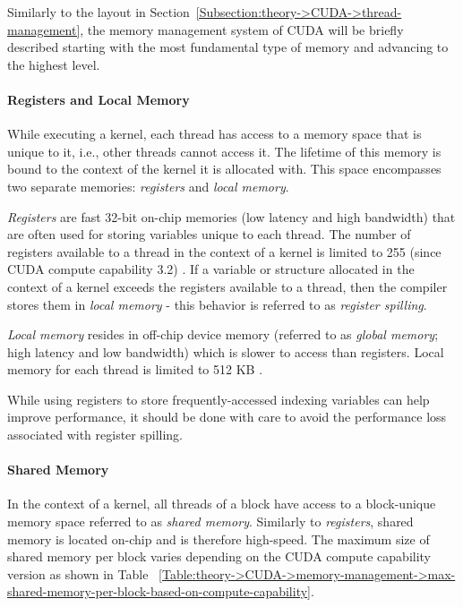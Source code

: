 Similarly to the layout in Section~\ref{Subsection:theory->CUDA->thread-management}, the memory management system of CUDA will be briefly described starting with the most fundamental type of memory and advancing to the highest level.

\paragraph{Registers and Local Memory} While executing a kernel, each thread has access to a memory space that is unique to it, i.e., other threads cannot access it.
The lifetime of this memory is bound to the context of the kernel it is allocated with.
This space encompasses two separate memories: \textit{registers} and \textit{local memory}.

\textit{Registers} are fast 32-bit on-chip memories (low latency and high bandwidth) that are often used for storing variables unique to each thread.
The number of registers available to a thread in the context of a kernel is limited to 255 (since CUDA compute capability 3.2) \cite{NVIDIADecember2022}.
If a variable or structure allocated in the context of a kernel exceeds the registers available to a thread, then the compiler stores them in \textit{local memory} - this behavior is referred to as \textit{register spilling}.

\textit{Local memory} resides in off-chip device memory (referred to as \textit{global memory}; high latency and low bandwidth) which is slower to access than registers.
Local memory for each thread is limited to 512 KB \cite{NVIDIADecember2022}.

While using registers to store frequently-accessed indexing variables can help improve performance, it should be done with care to avoid the performance loss associated with register spilling.

\paragraph{Shared Memory} In the context of a kernel, all threads of a block have access to a block-unique memory space referred to as \textit{shared memory}.
Similarly to \textit{registers}, shared memory is located on-chip and is therefore high-speed.
The maximum size of shared memory per block varies depending on the CUDA compute capability version as shown in Table ~\ref{Table:theory->CUDA->memory-management->max-shared-memory-per-block-based-on-compute-capability}.

